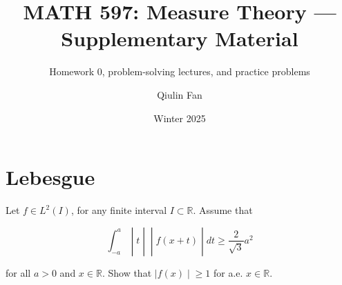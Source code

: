 \documentclass{qlnotes-export}
\title{MATH 597: Measure Theory --- Supplementary Material}
\subtitle{Homework 0, problem-solving lectures, and practice problems}
\author{Qiulin Fan}
\date{Winter 2025}
\begin{document}
\mainmatter
\chapter{Lebesgue}\label{lebesgue}

Let \(f \in L^{2}(I)\), for any finite interval \(I \subset {\mathbb{R}}\). Assume that

\[\left. \int_{- a}^{a} \middle| t \middle| \middle| f(x + t) \middle| dt \geq \frac{2}{\sqrt{3}}a^{2} \right.\]

for all \(a > 0\) and \(x \in {\mathbb{R}}\). Show that \(\left. |f(x) \middle| \geq 1 \right.\) for a.e. \(x \in {\mathbb{R}}\).
\end{document}
